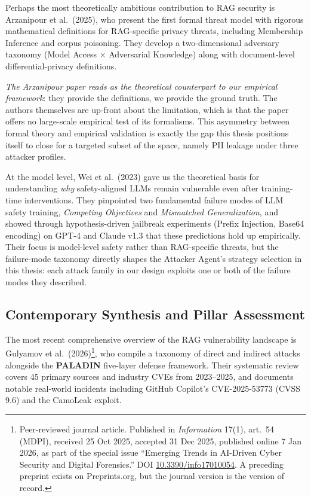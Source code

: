 \documentclass[12pt, a4paper]{report}
\begin{document}
Perhaps the most theoretically ambitious contribution to RAG security is Arzanipour et al.\ (2025), who present the first formal threat model with rigorous mathematical definitions for RAG-specific privacy threats, including Membership Inference and corpus poisoning. They develop a two-dimensional adversary taxonomy (Model Access $\times$ Adversarial Knowledge) along with document-level differential-privacy definitions.

\begin{critbox}
\textit{The Arzanipour paper reads as the theoretical counterpart to our empirical framework}: they provide the definitions, we provide the ground truth. The authors themselves are up-front about the limitation, which is that the paper offers no large-scale empirical test of its formalisms. This asymmetry between formal theory and empirical validation is exactly the gap this thesis positions itself to close for a targeted subset of the space, namely PII leakage under three attacker profiles.
\end{critbox}

At the model level, Wei et al.\ (2023) gave us the theoretical basis for understanding \emph{why} safety-aligned LLMs remain vulnerable even after training-time interventions. They pinpointed two fundamental failure modes of LLM safety training, \emph{Competing Objectives} and \emph{Mismatched Generalization}, and showed through hypothesis-driven jailbreak experiments (Prefix Injection, Base64 encoding) on GPT-4 and Claude v1.3 that these predictions hold up empirically. Their focus is model-level safety rather than RAG-specific threats, but the failure-mode taxonomy directly shapes the Attacker Agent's strategy selection in this thesis: each attack family in our design exploits one or both of the failure modes they described.

\subsection{Contemporary Synthesis and Pillar Assessment}

The most recent comprehensive overview of the RAG vulnerability landscape is Gulyamov et al.\ (2026)\footnote{Peer-reviewed journal article. Published in \emph{Information} 17(1), art.~54 (MDPI), received 25 Oct 2025, accepted 31 Dec 2025, published online 7 Jan 2026, as part of the special issue ``Emerging Trends in AI-Driven Cyber Security and Digital Forensics.'' DOI \href{https://doi.org/10.3390/info17010054}{10.3390/info17010054}. A preceding preprint exists on Preprints.org, but the journal version is the version of record.}, who compile a taxonomy of direct and indirect attacks alongside the \textbf{PALADIN} five-layer defense framework. Their systematic review covers 45 primary sources and industry CVEs from 2023--2025, and documents notable real-world incidents including GitHub Copilot's CVE-2025-53773 (CVSS 9.6) and the CamoLeak exploit.
\end{document}
